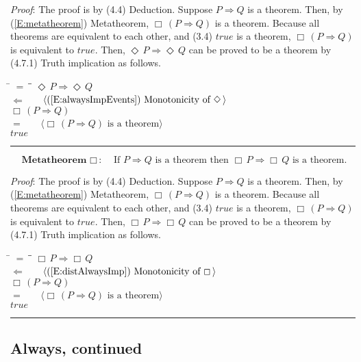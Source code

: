 \documentclass[12pt, fleqn, leqno]{article}
\newcommand{\lgap}{2pt}                             %
\newcommand{\mymathindent}{24pt}                    %
\newcommand{\impl}{\ensuremath{\Rightarrow}}        %
\newcommand{\foll}{\ensuremath{\Leftarrow}}         %
\newcommand{\Event}{\Diamond\,}
\newcommand{\Always}{\Box\,}
\newcommand{\myqed}{\rule[-.23ex]{1.2ex}{2.0ex}}
\newcommand{\myqedtab}{\hspace{384pt}}              %
\newcommand{\Gll} {\langle}                         %
\newcommand{\Ggg} {\rangle}                         %
\newcommand{\Hint}[1]     {\ \ \ $\Gll              \mbox{#1} \Ggg$ }   %
\begin{document}
\emph{Proof}: The proof is by (4.4) Deduction.
Suppose $P\impl Q$ is a theorem.
Then, by (\ref{E:metatheorem}) Metatheorem, $\Always (P\impl Q)$ is a theorem.
Because all theorems are equivalent to each other, and (3.4) $true$ is a theorem, $\Always (P\impl Q)$ is equivalent to $true$.
Then, $\Event P\impl\Event Q$ can be proved to be a theorem by (4.7.1) Truth implication as follows.
\begin{tabbing}
\hspace{\mymathindent} \= $= \;$ \= \myqedtab \= \kill
\> \> $\Event P\impl\Event Q$\\[\lgap]
\> $\foll$ \> \Hint{(\ref{E:alwaysImpEvents}) Monotonicity of $\Event$} \\[\lgap]
\> \> $\Always (P\impl Q)$\\[\lgap]
\> $=$ \> \Hint{$\Always (P\impl Q)$ is a theorem} \\[\lgap]
\> \> $true$ \quad \myqed
\end{tabbing}
\begin{equation}\label{E:metaAlways}
\textbf{Metatheorem $\Always$:}\quad \text{If } P\impl Q \text{ is a theorem then } \Always P\impl\Always Q \text{ is a theorem.}
\end{equation}

\emph{Proof}: The proof is by (4.4) Deduction.
Suppose $P\impl Q$ is a theorem.
Then, by (\ref{E:metatheorem}) Metatheorem, $\Always (P\impl Q)$ is a theorem.
Because all theorems are equivalent to each other, and (3.4) $true$ is a theorem, $\Always (P\impl Q)$ is equivalent to $true$.
Then, $\Always P\impl\Always Q$ can be proved to be a theorem by (4.7.1) Truth implication as follows.
\begin{tabbing}
\hspace{\mymathindent} \= $= \;$ \= \myqedtab \= \kill
\> \> $\Always P\impl\Always Q$\\[\lgap]
\> $\foll$ \> \Hint{(\ref{E:distAlwaysImp}) Monotonicity of $\Always$} \\[\lgap]
\> \> $\Always (P\impl Q)$\\[\lgap]
\> $=$ \> \Hint{$\Always (P\impl Q)$ is a theorem} \\[\lgap]
\> \> $true$ \quad \myqed
\end{tabbing}

\subsection{Always, continued}\label{section-always-continued-2}
\end{document}
